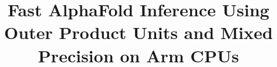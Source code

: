 \documentclass[sigconf,review,anonymous]{acmart}
\begin{document}
\title{Fast AlphaFold Inference Using Outer Product Units and Mixed Precision on Arm CPUs}



%
%
\end{document}
